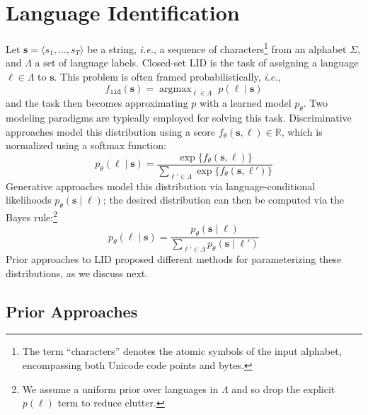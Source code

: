 \documentclass{article}
\makeatletter
\newcommand{\ie}{\emph{i.e.}\@\xspace}
\newcommand{\R}{\mathbb{R}}
\newcommand{\writemore}{{\color{red} ... (write more)}\xspace}
\newcommand{\stringunit}{s}
\newcommand{\str}{\mathbf{\stringunit}}
\newcommand{\stralphabet}{\Sigma}
\newcommand{\lang}{\ell}
\newcommand{\languages}{\Lambda}
\newcommand{\model}{p_{\theta}}
\DeclareMathOperator*{\argmax}{\mathrm{argmax}}
\makeatother
\begin{document}
\newcommand{\lidfunc}{f_\mathtt{lid}}

\section{Language Identification}

Let $\str=\langle\stringunit_1, \dots, \stringunit_T\rangle$ be a string, \ie, a sequence of characters\footnote{The term \enquote{characters} denotes the atomic symbols of the input alphabet, encompassing both Unicode code points and bytes.}
from an alphabet $\stralphabet$, and $\languages$ a set of language labels. 
Closed-set LID is the task of assigning a language $\lang\in\languages$ to $\str$. 
This problem is often framed probabilistically, \ie,
\begin{equation}\label{eq:lang-id}
    \lidfunc(\str) = \argmax_{\lang\in\languages} \,\,p(\lang\mid\str)
\end{equation}
and the task then becomes approximating $p$ with a learned model $\model$. 
Two modeling paradigms are typically employed for solving this task. Discriminative approaches model this distribution using a score $f_\theta(\str,\lang)\in\R$, which is normalized using a softmax function:
\begin{equation}\label{eq:discriminative}
    \model(\lang \mid \str) = \frac{\exp\{f_\theta(\str,\lang)\}}{\sum_{\lang'\in\languages}\exp\{f_\theta(\str,\lang')\}}
\end{equation}
Generative approaches model this distribution via language-conditional likelihoods $\model(\str\mid \lang)$; the desired distribution can then be computed via the Bayes rule:\footnote{We assume a uniform prior over languages in $\languages$ and so drop the explicit $p(\lang)$ term to reduce clutter. }
\begin{equation}\label{eq:bayes}
\model(\lang \mid \str) = \frac{\model(\str \mid \lang)}{\sum_{\lang'\in\languages} \model(\str \mid \lang')}
\end{equation} 
Prior approaches to LID proposed different methods for parameterizing these distributions, as we discuss next.



\subsection{Prior Approaches}
\end{document}
